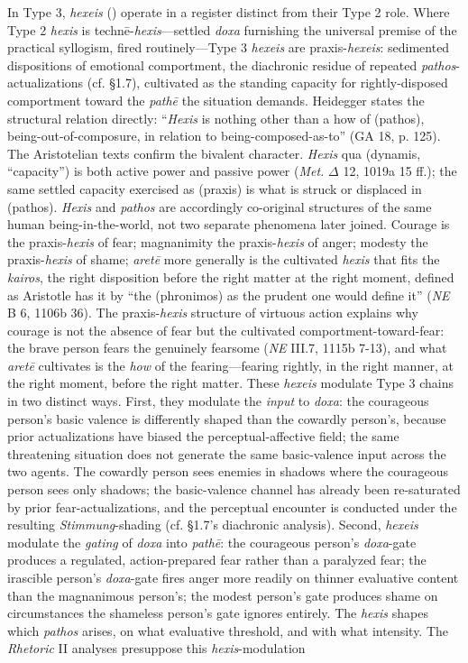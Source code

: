 In Type 3, \textit{hexeis} () operate in a register distinct from their Type 2 role. Where Type 2 \textit{hexis} is technē-\textit{hexis}---settled \textit{doxa} furnishing the universal premise of the practical syllogism, fired routinely---Type 3 \textit{hexeis} are praxis-\textit{hexeis}: sedimented dispositions of emotional comportment, the diachronic residue of repeated \textit{pathos}-actualizations (cf. \S 1.7), cultivated as the standing capacity for rightly-disposed comportment toward the \textit{pathē} the situation demands. Heidegger states the structural relation directly: ``\textit{Hexis} is nothing other than a how of  (pathos), being-out-of-composure, in relation to being-composed-as-to'' (GA 18, p. 125). The Aristotelian texts confirm the bivalent character. \textit{Hexis} qua  (dynamis, ``capacity'') is both active power and passive power (\textit{Met.} $\Delta$ 12, 1019a 15 ff.); the same settled capacity exercised as  (praxis) is what is struck or displaced in  (pathos). \textit{Hexis} and \textit{pathos} are accordingly co-original structures of the same human being-in-the-world, not two separate phenomena later joined. Courage is the praxis-\textit{hexis} of fear; magnanimity the praxis-\textit{hexis} of anger; modesty the praxis-\textit{hexis} of shame; \textit{aretē} more generally is the cultivated \textit{hexis} that fits the \textit{kairos}, the right disposition before the right matter at the right moment, defined as Aristotle has it by ``the  (phronimos) as the prudent one would define it'' (\textit{NE} B 6, 1106b 36). The praxis-\textit{hexis} structure of virtuous action explains why courage is not the absence of fear but the cultivated comportment-toward-fear: the brave person fears the genuinely fearsome (\textit{NE} III.7, 1115b 7-13), and what \textit{aretē} cultivates is the \textit{how} of the fearing---fearing rightly, in the right manner, at the right moment, before the right matter. These \textit{hexeis} modulate Type 3 chains in two distinct ways. First, they modulate the \textit{input} to \textit{doxa}: the courageous person's basic valence is differently shaped than the cowardly person's, because prior actualizations have biased the perceptual-affective field; the same threatening situation does not generate the same basic-valence input across the two agents. The cowardly person sees enemies in shadows where the courageous person sees only shadows; the basic-valence channel has already been re-saturated by prior fear-actualizations, and the perceptual encounter is conducted under the resulting \textit{Stimmung}-shading (cf. \S 1.7's diachronic analysis). Second, \textit{hexeis} modulate the \textit{gating} of \textit{doxa} into \textit{pathē}: the courageous person's \textit{doxa}-gate produces a regulated, action-prepared fear rather than a paralyzed fear; the irascible person's \textit{doxa}-gate fires anger more readily on thinner evaluative content than the magnanimous person's; the modest person's gate produces shame on circumstances the shameless person's gate ignores entirely. The \textit{hexis} shapes which \textit{pathos} arises, on what evaluative threshold, and with what intensity. The \textit{Rhetoric} II analyses presuppose this \textit{hexis}-modulation 